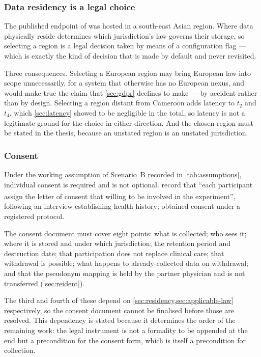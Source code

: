 \documentclass[12pt,a4paper,oneside]{report}
\newcommand{\bq}[1]{``#1''\textsuperscript{\dag}}
\begin{document}
\subsubsection{Data residency is a legal choice}\label{sec:residency}

The published endpoint of \textcite{efendi2025} was hosted in a south-east Asian region. Where data physically reside determines which jurisdiction's law governs their storage, so selecting a region is a legal decision taken by means of a configuration flag --- which is exactly the kind of decision that is made by default and never revisited.

Three consequences. Selecting a European region may bring European law into scope unnecessarily, for a system that otherwise has no European nexus, and would make true the claim that \cref{sec:gdpr} declines to make --- by accident rather than by design. Selecting a region distant from Cameroon adds latency to $t_2$ and $t_4$, which \cref{sec:latency} showed to be negligible in the total, so latency is not a legitimate ground for the choice in either direction. And the chosen region must be stated in the thesis, because an unstated region is an unstated jurisdiction.

\subsubsection{Consent}\label{sec:consent}

Under the working assumption of Scenario~B recorded in \cref{tab:assumptions}, individual consent is required and is not optional. \Textcite{efendi2025} record that \bq{each participant assign the letter of consent that willing to be involved in the experiment}, following an interview establishing health history; \textcite{mihevc2025} obtained consent under a registered protocol.

The consent document must cover eight points: what is collected; who sees it; where it is stored and under which jurisdiction; the retention period and destruction date; that participation does not replace clinical care; that withdrawal is possible; what happens to already-collected data on withdrawal; and that the pseudonym mapping is held by the partner physician and is not transferred (\cref{sec:reident}).

The third and fourth of these depend on \cref{sec:residency,sec:applicable-law} respectively, so the consent document cannot be finalised before those are resolved. This dependency is stated because it determines the order of the remaining work: the legal instrument is not a formality to be appended at the end but a precondition for the consent form, which is itself a precondition for collection.
\end{document}
